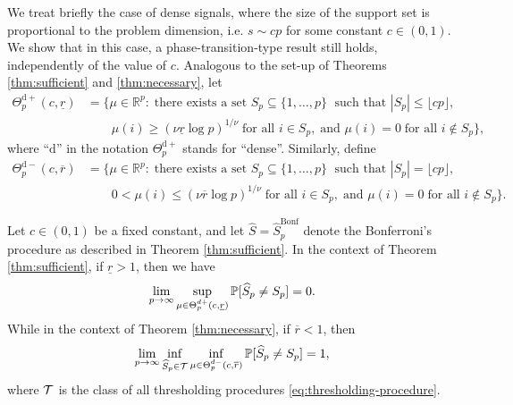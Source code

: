 We treat briefly the case of dense signals,
where the size of the support set is proportional to the problem dimension, i.e. $s\sim cp$ for some constant $c\in(0,1)$.
We show that in this case, a phase-transition-type result still holds, independently of the value of $c$. 
Analogous to the set-up of Theorems \ref{thm:sufficient} and \ref{thm:necessary}, let
\begin{align} \label{eq:minimax-signal-config-over-dense}
    \Theta_p^{\mathrm{d}+}(c, \underline{r}) &= \{\mu\in\mathbb{R}^p:\;\text{there exists a set }S_p\subseteq\{1,\ldots,p\}\;\text{ such that }|S_p|\le\lfloor cp\rfloor, \nonumber \\
    &\quad\quad\mu(i)\ge (\nu\underline{r}\log{p})^{1/\nu}\;\text{for all }i\in S_p,\;\text{and }\mu(i)=0\;\text{for all }i\not\in S_p\},
\end{align}
where ``$\mathrm{d}$'' in the notation $\Theta_p^{\mathrm{d}+}$ stands for ``dense''. 
Similarly, define
\begin{align} \label{eq:minimax-signal-config-under-dense}
    \Theta_p^{\mathrm{d}-}(c, \overline{r}) &= \{\mu\in\mathbb{R}^p:\;\text{there exists a set }S_p\subseteq\{1,\ldots,p\}\;\text{ such that }|S_p|=\lfloor cp\rfloor, \nonumber \\
    &\quad\quad0<\mu(i)\le (\nu\overline{r}\log{p})^{1/\nu}\;\text{for all }i\in S_p,\;\text{and }\mu(i)=0\;\text{for all }i\not\in S_p\}.
\end{align}

\begin{theorem} \label{thm:dense-signals}
Let $c\in(0,1)$ be a fixed constant, and let $\widehat{S} = \widehat{S}^{\text{Bonf}}_p$ denote the Bonferroni's procedure as described in Theorem \ref{thm:sufficient}.
In the context of Theorem \ref{thm:sufficient}, if $\underline{r} > 1$, then we have
\begin{equation} \label{eq:exact-supporot-recovery-dense}
    \lim_{p\to\infty}\sup_{\mu\in\Theta_p^{d+}(c, \underline{r})} \P[\widehat{S}_p \neq S_p] = 0.
\end{equation}
While in the context of Theorem \ref{thm:necessary}, if $\overline{r} < 1$, then
\begin{equation} \label{eq:classification-impossible-dependent-dense}
    \lim_{p\to\infty} \inf_{\widehat{S}_p\in{\cal T}} \inf_{\mu\in{\Theta_p^{d-}(c, \overline{r})}} \P[\widehat{S}_p \neq S_p] = 1,
\end{equation}
where ${\cal T}$ is the class of all thresholding procedures \eqref{eq:thresholding-procedure}.
\end{theorem}

